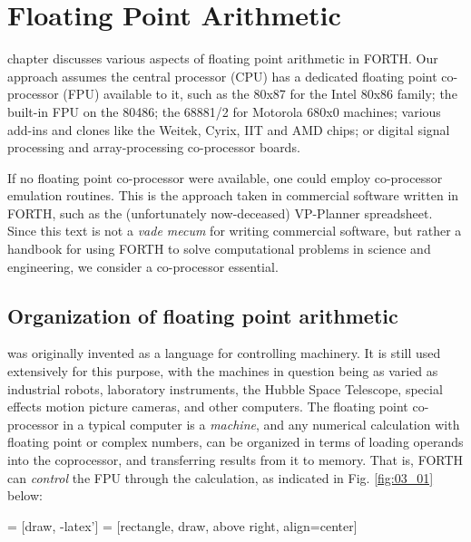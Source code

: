 
\chapter{Floating Point Arithmetic}



 chapter discusses various aspects of floating point arithmetic in FORTH. Our approach assumes the central processor (CPU) has a dedicated floating point co-processor (FPU) available to it, such as the 80x87 for the Intel 80x86 family; the built-in FPU on the 80486; the 68881/2 for Motorola 680x0 machines; various add-ins and clones like the Weitek, Cyrix, IIT and AMD chips; or digital signal processing and array-processing co-processor boards.

If no floating point co-processor were available, one could employ co-processor emulation routines. This is the approach taken in commercial software written in FORTH, such as the (unfortunately now-deceased) VP-Planner spreadsheet. Since this text is not a \textit{vade mecum} for writing commercial software, but rather a handbook for using FORTH to solve computational problems in science and engineering, we consider a co-processor essential.

\section{Organization of floating point arithmetic}

 was originally invented as a language for controlling machinery. It is still used extensively for this purpose, with the machines in question being as varied as industrial robots, laboratory instruments, the Hubble Space Telescope, special effects motion picture cameras, and other computers. The floating point co-processor in a typical computer is a \textit{machine}, and any numerical calculation with floating point or complex numbers, \eg can be organized in terms of loading operands into the coprocessor, and transferring results from it to memory. That is, FORTH can \textit{control} the FPU through the calculation, as indicated in Fig. \ref{fig:03_01} below:

 = [draw, -latex']
 = [rectangle, draw, above right, align=center]

